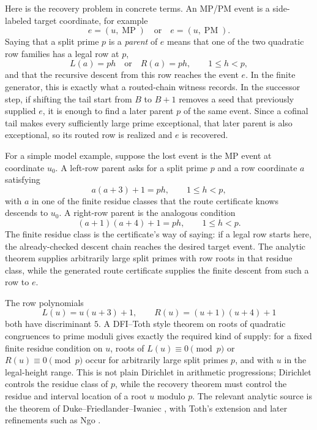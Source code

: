 \documentclass[11pt]{article}
\begin{document}
Here is the recovery problem in concrete terms.  An MP/PM event is a
side-labeled target coordinate, for example
\[
  e=(u,\operatorname{MP})
  \quad\text{or}\quad
  e=(u,\operatorname{PM}).
\]
Saying that a split prime \(p\) is a \emph{parent} of \(e\) means that one of
the two quadratic row families has a legal row at \(p\),
\[
  L(a)=p h
  \quad\text{or}\quad
  R(a)=p h,
  \qquad 1\le h<p,
\]
and that the recursive descent from this row reaches the event \(e\).  In the
finite generator, this is exactly what a routed-chain witness records.  In the
successor step, if shifting the tail start from \(B\) to \(B+1\) removes a seed
that previously supplied \(e\), it is enough to find a later parent \(p\) of
the same event.  Since a cofinal tail makes every sufficiently large prime
exceptional, that later parent is also exceptional, so its routed row is
realized and \(e\) is recovered.

For a simple model example, suppose the lost event is the MP event at coordinate
\(u_0\).  A left-row parent asks for a split prime \(p\) and a row coordinate
\(a\) satisfying
\[
  a(a+3)+1=p h,\qquad 1\le h<p,
\]
with \(a\) in one of the finite residue classes that the route certificate
knows descends to \(u_0\).  A right-row parent is the analogous condition
\[
  (a+1)(a+4)+1=p h,\qquad 1\le h<p.
\]
The finite residue class is the certificate's way of saying: if a legal row
starts here, the already-checked descent chain reaches the desired target
event.  The analytic theorem supplies arbitrarily large split primes with row
roots in that residue class, while the generated route certificate supplies the
finite descent from such a row to \(e\).

The row polynomials
\[
  L(u)=u(u+3)+1,\qquad R(u)=(u+1)(u+4)+1
\]
both have discriminant \(5\).  A DFI--Toth style theorem on roots of quadratic
congruences to prime moduli gives exactly the required kind of supply:
for a fixed finite residue condition on \(u\), roots of \(L(u)\equiv0\pmod p\)
or \(R(u)\equiv0\pmod p\) occur for arbitrarily large split primes \(p\), and
with \(u\) in the legal-height range.  This is not plain Dirichlet in
arithmetic progressions; Dirichlet controls the residue class of \(p\), while
the recovery theorem must control the residue and interval location of a root
\(u\) modulo \(p\).  The relevant analytic source is the theorem of
Duke--Friedlander--Iwaniec \cite{DFI1995}, with Toth's extension
\cite{Toth2000} and later refinements such as Ngo \cite{Ngo2021}.
\end{document}
